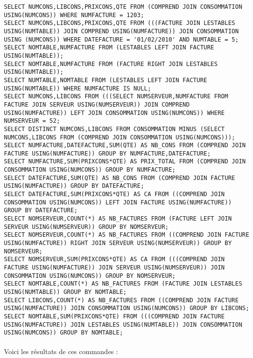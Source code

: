 \documentclass{report}
\begin{document}
\begin{lstlisting}[firstnumber=2]
SELECT NUMCONS,LIBCONS,PRIXCONS,QTE FROM (COMPREND JOIN CONSOMMATION USING(NUMCONS)) WHERE NUMFACTURE = 1203;
SELECT NUMCONS,LIBCONS,PRIXCONS,QTE FROM (((FACTURE JOIN LESTABLES USING(NUMTABLE)) JOIN COMPREND USING(NUMFACTURE)) JOIN CONSOMMATION USING (NUMCONS)) WHERE DATEFACTURE = '01/02/2010' AND NUMTABLE = 5;
SELECT NOMTABLE,NUMFACTURE FROM (LESTABLES LEFT JOIN FACTURE USING(NUMTABLE));
SELECT NOMTABLE,NUMFACTURE FROM (FACTURE RIGHT JOIN LESTABLES USING(NUMTABLE));
SELECT NUMTABLE,NOMTABLE FROM (LESTABLES LEFT JOIN FACTURE USING(NUMTABLE)) WHERE NUMFACTURE IS NULL;
SELECT NUMCONS,LIBCONS FROM (((SELECT NUMSERVEUR,NUMFACTURE FROM FACTURE JOIN SERVEUR USING(NUMSERVEUR)) JOIN COMPREND USING(NUMFACTURE)) LEFT JOIN CONSOMMATION USING(NUMCONS)) WHERE NUMSERVEUR = 52;
SELECT DISTINCT NUMCONS,LIBCONS FROM CONSOMMATION MINUS (SELECT NUMCONS,LIBCONS FROM (COMPREND JOIN CONSOMMATION USING(NUMCONS)));
SELECT NUMFACTURE,DATEFACTURE,SUM(QTE) AS NB_CONS FROM (COMPREND JOIN FACTURE USING(NUMFACTURE)) GROUP BY NUMFACTURE,DATEFACTURE;
SELECT NUMFACTURE,SUM(PRIXCONS*QTE) AS PRIX_TOTAL FROM (COMPREND JOIN CONSOMMATION USING(NUMCONS)) GROUP BY NUMFACTURE;
SELECT DATEFACTURE,SUM(QTE) AS NB_CONS FROM (COMPREND JOIN FACTURE USING(NUMFACTURE)) GROUP BY DATEFACTURE;
SELECT DATEFACTURE,SUM(PRIXCONS*QTE) AS CA FROM ((COMPREND JOIN CONSOMMATION USING(NUMCONS)) LEFT JOIN FACTURE USING(NUMFACTURE)) GROUP BY DATEFACTURE;
SELECT NOMSERVEUR,COUNT(*) AS NB_FACTURES FROM (FACTURE LEFT JOIN SERVEUR USING(NUMSERVEUR)) GROUP BY NOMSERVEUR;
SELECT NOMSERVEUR,COUNT(*) AS NB_FACTURES FROM ((COMPREND JOIN FACTURE USING(NUMFACTURE)) RIGHT JOIN SERVEUR USING(NUMSERVEUR)) GROUP BY NOMSERVEUR;
SELECT NOMSERVEUR,SUM(PRIXCONS*QTE) AS CA FROM (((COMPREND JOIN FACTURE USING(NUMFACTURE)) JOIN SERVEUR USING(NUMSERVEUR)) JOIN CONSOMMATION USING(NUMCONS)) GROUP BY NOMSERVEUR;
SELECT NOMTABLE,COUNT(*) AS NB_FACTURES FROM (FACTURE JOIN LESTABLES USING(NUMTABLE)) GROUP BY NOMTABLE;
SELECT LIBCONS,COUNT(*) AS NB_FACTURES FROM ((COMPREND JOIN FACTURE USING(NUMFACTURE)) JOIN CONSOMMATION USING(NUMCONS)) GROUP BY LIBCONS;
SELECT NOMTABLE,SUM(PRIXCONS*QTE) FROM (((COMPREND JOIN FACTURE USING(NUMFACTURE)) JOIN LESTABLES USING(NUMTABLE)) JOIN CONSOMMATION USING(NUMCONS)) GROUP BY NOMTABLE;
\end{lstlisting}

\paragraph{}Voici les résultats de ces commandes :
\end{document}

